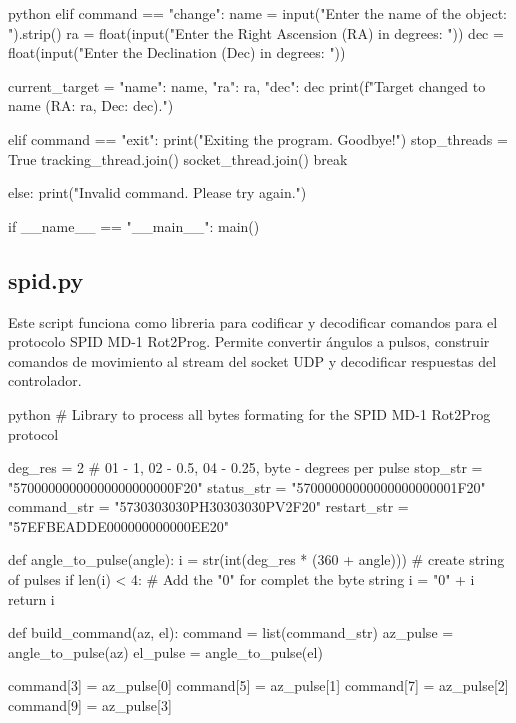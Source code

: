 \begin{appendixs}
\begin{sourcecode}[]{python}{}
            elif command == "change":
                name = input("Enter the name of the object: ").strip()
                ra = float(input("Enter the Right Ascension (RA) in degrees: "))
                dec = float(input("Enter the Declination (Dec) in degrees: "))
    
                current_target = {"name": name, "ra": ra, "dec": dec}
                print(f"Target changed to {name} (RA: {ra}, Dec: {dec}).")
    
            elif command == "exit":
                print("Exiting the program. Goodbye!")
                stop_threads = True
                tracking_thread.join()
                socket_thread.join()
                break
    
            else:
                print("Invalid command. Please try again.")
    
    
    if __name__ == "__main__":
        main()
    
\end{sourcecode}

\subsection{spid.py}

Este script funciona como libreria para codificar y decodificar comandos para el protocolo SPID MD-1 Rot2Prog. Permite convertir ángulos a pulsos, construir comandos de movimiento al stream del socket UDP y decodificar respuestas del controlador.

\begin{sourcecode}[]{python}{}
    # Library to process all bytes formating for the SPID MD-1 Rot2Prog protocol

    deg_res = 2 # 01 - 1, 02 - 0.5, 04 - 0.25, byte - degrees per pulse
    stop_str = "57000000000000000000000F20"
    status_str = "57000000000000000000001F20"
    command_str = "5730303030PH30303030PV2F20"
    restart_str = "57EFBEADDE000000000000EE20"
    
    def angle_to_pulse(angle):
        i = str(int(deg_res * (360 + angle))) # create string of pulses
        if len(i) < 4: # Add the "0" for complet the byte string
            i = "0" + i
        return i
    
    def build_command(az, el):
        command = list(command_str)
        az_pulse = angle_to_pulse(az)
        el_pulse = angle_to_pulse(el)
    
        command[3] = az_pulse[0]
        command[5] = az_pulse[1]
        command[7] = az_pulse[2]
        command[9] = az_pulse[3]
    

\end{sourcecode}
\end{appendixs}
